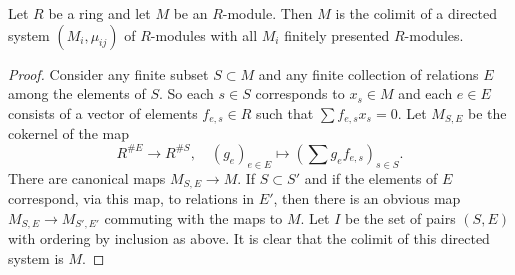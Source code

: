 \begin{lemma}
\label{lemma-module-colimit-fp}
Let $R$ be a ring and let $M$ be an $R$-module.
Then $M$ is the colimit of a directed system
$(M_i, \mu_{ij})$ of $R$-modules
with all $M_i$ finitely presented $R$-modules.
\end{lemma}

\begin{proof}
Consider any finite subset $S \subset M$ and any finite
collection of relations $E$ among the elements
of $S$. So each $s \in S$ corresponds to $x_s \in M$ and
each $e \in E$ consists of a vector
of elements $f_{e, s} \in R$ such that $\sum f_{e, s} x_s = 0$.
Let $M_{S, E}$ be the cokernel of the map
$$
R^{\# E} \longrightarrow R^{\# S}, \quad
(g_e)_{e\in E} \longmapsto (\sum g_e f_{e, s})_{s\in S}.
$$
There are canonical maps $M_{S, E} \to M$.
If $S \subset S'$ and if the elements of
$E$ correspond, via this map, to relations
in $E'$, then there is an obvious map
$M_{S, E} \to M_{S', E'}$ commuting with the
maps to $M$. Let $I$ be the set of pairs
$(S, E)$ with ordering by inclusion as above.
It is clear that the colimit of this directed system is $M$.
\end{proof}
